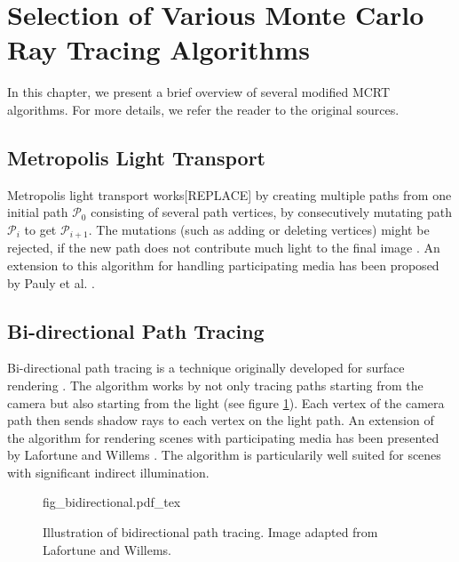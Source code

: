 \section{Selection of Various Monte Carlo Ray Tracing Algorithms}
\label{sec:mc_algorithms}
In this chapter, we present a brief overview of several modified MCRT algorithms. For more details, we refer the reader to the original sources.
\subsection{Metropolis Light Transport}
Metropolis light transport\cite{metropolis} works[REPLACE] by creating multiple paths from one initial path $\mathcal{P}_0$ consisting of several path vertices, by consecutively mutating path $\mathcal{P}_i$ to get $\mathcal{P}_{i+1}$. The mutations (such as adding or deleting vertices) might be rejected, if the new path does not contribute much light to the final image \cite{metropolis}. An extension to this algorithm for handling participating media has been proposed by Pauly et al. \cite{10.1007/978-3-7091-6303-0_2}.
\subsection{Bi-directional Path Tracing}
Bi-directional path tracing is a technique originally developed for surface rendering \cite{bidirectional-ray-tracing}. The algorithm works by not only tracing paths starting from the camera but also starting from the light (see figure \ref{fig:bidirectional}). Each vertex of the camera path then sends shadow rays to each vertex on the light path. An extension of the algorithm for rendering scenes with participating media has been presented by Lafortune and Willems \cite{10.5555/275458.275468}. The algorithm is particularily well suited for scenes with significant indirect illumination.
\begin{figure}
\centering
\def\svgwidth{\columnwidth}
{fig_bidirectional.pdf_tex}

\caption{Illustration of bidirectional path tracing. Image adapted from Lafortune and Willems\cite{10.5555/275458.275468}.}
\label{fig:bidirectional}
\end{figure}

